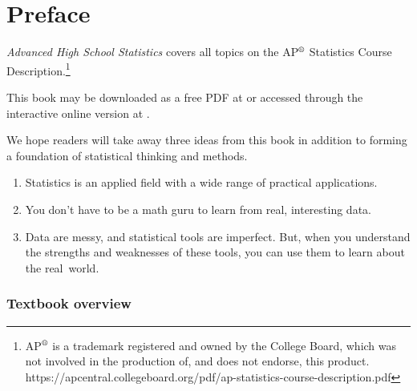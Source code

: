 \chapter*{Preface\vspace{-6mm}}


\emph{Advanced High School Statistics} covers all topics on the AP$^{\text{\textregistered}}$ Statistics Course Description.\footnote{AP$^{\text{\textregistered}}$ is a trademark registered and owned by the College Board, which was not involved in the production of, and does not endorse, this product.  https://apcentral.collegeboard.org/pdf/ap-statistics-course-description.pdf }
\vspace{3mm}

\noindent 
This book may be downloaded as a free PDF at  or accessed through the interactive online version at .
\vspace{3mm}

\noindent We hope readers will take away three ideas from this book in addition to forming a foundation of statistical thinking and methods.\vspace{-1mm}
\begin{enumerate}
\setlength{\itemsep}{0mm}
\item[(1)] Statistics is an applied field with a wide range of practical applications.
\item[(2)] You don't have to be a math guru to learn from real, interesting data.
\item[(3)] Data are messy, and statistical tools are imperfect. But, when you understand the strengths and weaknesses of these tools, you can use them to learn about the real~world.
\end{enumerate}


\subsection*{Textbook overview}

